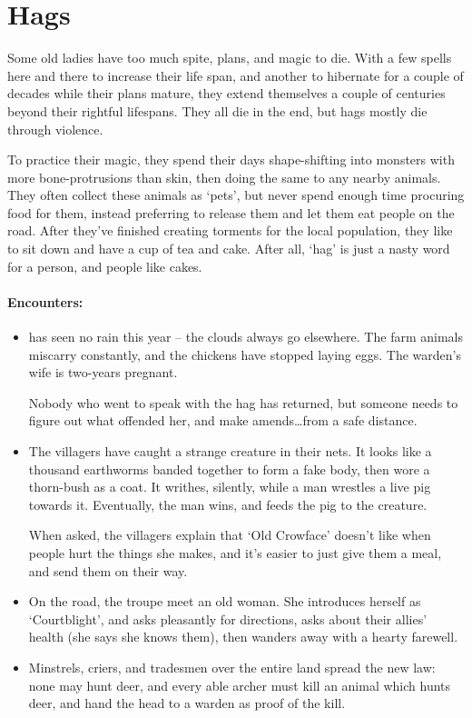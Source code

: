 \section[Hag]{Hags}
\label{hag}

\begin{multicols}{2}

\noindent
Some old ladies have too much spite, plans, and magic to die.
With a few spells here and there to increase their life span, and another to hibernate for a couple of decades while their plans mature, they extend themselves a couple of centuries beyond their rightful lifespans.
They all die in the end, but hags mostly die through violence.

To practice their magic, they spend their days shape-shifting into monsters with more bone-protrusions than skin, then doing the same to any nearby animals.
They often collect these animals as `pets', but never spend enough time procuring food for them, instead preferring to release them and let them eat people on the road.
After they've finished creating torments for the local population, they like to sit down and have a cup of tea and cake.
After all, `hag' is just a nasty word for a person, and people like cakes.

\paragraph{Encounters:}

\begin{itemize}
  \item
   has seen no rain this year -- the clouds always go elsewhere.
  The farm animals miscarry constantly, and the chickens have stopped laying eggs.
  The warden's wife is two-years pregnant.

  Nobody who went to speak with the hag has returned, but someone needs to figure out what offended her, and make amends\ldots from a safe distance.
  \item
  The villagers have caught a strange creature in their nets.
  It looks like a thousand earthworms banded together to form a fake body, then wore a thorn-bush as a coat.
  It writhes, silently, while a man wrestles a live pig towards it.
  Eventually, the man wins, and feeds the pig to the creature.

  When asked, the villagers explain that `Old Crowface' doesn't like when people hurt the things she makes, and it's easier to just give them a meal, and send them on their way.
  \item
  On the road, the troupe meet an old woman.
  She introduces herself as `Courtblight', and asks pleasantly for directions, asks about their allies' health (she says she knows them), then wanders away with a hearty farewell.
  \item
  Minstrels, criers, and tradesmen over the entire land spread the new law: none may hunt deer, and every able archer must kill an animal which hunts deer, and hand the head to a warden as proof of the kill.


\end{itemize}
\end{multicols}
